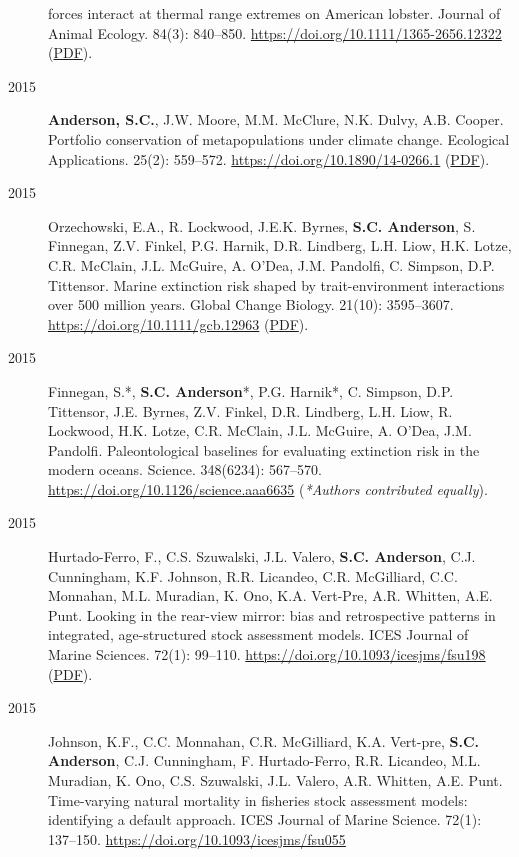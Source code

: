 \begin{description}
forces interact at thermal range extremes on American lobster. Journal
of Animal Ecology. 84(3): 840--850.
\url{https://doi.org/10.1111/1365-2656.12322}
(\href{https://www.dropbox.com/s/w027swfx2o8hgvl/Boudreau_etal_2015_lobster.pdf?dl=1}{PDF}).
\item[2015]
\textbf{Anderson, S.C.}, J.W. Moore, M.M. McClure, N.K. Dulvy, A.B.
Cooper. Portfolio conservation of metapopulations under climate change.
Ecological Applications. 25(2): 559--572.
\url{https://doi.org/10.1890/14-0266.1}
(\href{https://www.dropbox.com/s/141rsnv5rc7mi5i/Anderson_etal_2015_salmonportfolios.pdf?dl=1}{PDF}).
\item[2015]
Orzechowski, E.A., R. Lockwood, J.E.K. Byrnes, \textbf{S.C. Anderson},
S. Finnegan, Z.V. Finkel, P.G. Harnik, D.R. Lindberg, L.H. Liow, H.K.
Lotze, C.R. McClain, J.L. McGuire, A. O'Dea, J.M. Pandolfi, C. Simpson,
D.P. Tittensor. Marine extinction risk shaped by trait-environment
interactions over 500 million years. Global Change Biology. 21(10):
3595--3607. \url{https://doi.org/10.1111/gcb.12963}
(\href{https://sean.updog.co/papers/Orzechowski_etal_2015_paleometa.pdf}{PDF}).
\item[2015]
Finnegan, S.*, \textbf{S.C. Anderson}*, P.G. Harnik*, C. Simpson, D.P.
Tittensor, J.E. Byrnes, Z.V. Finkel, D.R. Lindberg, L.H. Liow, R.
Lockwood, H.K. Lotze, C.R. McClain, J.L. McGuire, A. O'Dea, J.M.
Pandolfi. Paleontological baselines for evaluating extinction risk in
the modern oceans. Science. 348(6234): 567--570.
\url{https://doi.org/10.1126/science.aaa6635} (\emph{*Authors
contributed equally}).
\item[2015]
Hurtado-Ferro, F., C.S. Szuwalski, J.L. Valero, \textbf{S.C. Anderson},
C.J. Cunningham, K.F. Johnson, R.R. Licandeo, C.R. McGilliard, C.C.
Monnahan, M.L. Muradian, K. Ono, K.A. Vert-Pre, A.R. Whitten, A.E. Punt.
Looking in the rear-view mirror: bias and retrospective patterns in
integrated, age-structured stock assessment models. ICES Journal of
Marine Sciences. 72(1): 99--110.
\url{https://doi.org/10.1093/icesjms/fsu198}
(\href{https://sean.updog.co/papers/Hurtado-Ferro_etal_2014_retrospective.pdf}{PDF}).
\item[2015]
Johnson, K.F., C.C. Monnahan, C.R. McGilliard, K.A. Vert-pre,
\textbf{S.C. Anderson}, C.J. Cunningham, F. Hurtado-Ferro, R.R.
Licandeo, M.L. Muradian, K. Ono, C.S. Szuwalski, J.L. Valero, A.R.
Whitten, A.E. Punt. Time-varying natural mortality in fisheries stock
assessment models: identifying a default approach. ICES Journal of
Marine Science. 72(1): 137--150.
\url{https://doi.org/10.1093/icesjms/fsu055}

\end{description}
